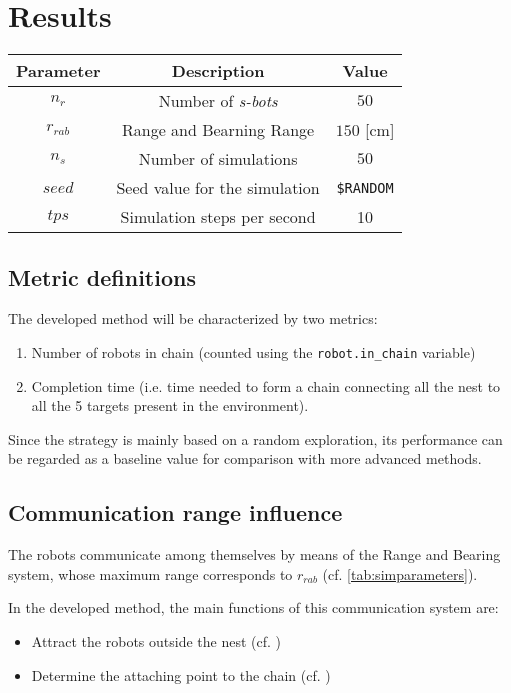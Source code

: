\section{Results} \label{sec:results}

\begin{center}
\begin{tabular}{|c|c|c|}
\hline
\textbf{Parameter} & \textbf{Description} & \textbf{Value} \\ \hline
$n_r$ & Number of \emph{s-bots} & $50$ \\ \hline
$r_{rab}$ & Range and Bearning Range & $150$ [cm] \\ \hline
$n_s$ & Number of simulations & $50$ \\ \hline
$seed$ & Seed value for the simulation & \verb|$RANDOM|\footnotemark[1] \\ \hline
$tps$ & Simulation steps per second & 10 \\ \hline
\end{tabular}
\label{tab:simparameters}
\end{center}

\subsection{Metric definitions}\label{subsec:metric}
The developed method will be characterized by two metrics:
\begin{enumerate}
  \item Number of robots in chain (counted using the \verb|robot.in_chain| variable)
  \item Completion time (i.e. time needed to form a chain connecting  all the nest to all the 5 targets present in the environment).
\end{enumerate}
Since the strategy is mainly based on a random exploration, its performance can be regarded as a baseline value for comparison with more advanced methods.

\subsection{Communication range influence}\label{subsec:comrange}
The robots communicate among themselves by means of the Range and Bearing 
system, whose maximum range corresponds to $r_{rab}$ (cf. \ref{tab:simparameters}).

In the developed method, the main functions of this communication system are:
\begin{itemize}
  \item Attract the robots outside the nest (cf. )
  \item Determine the attaching point to the chain (cf. )
\end{itemize}

